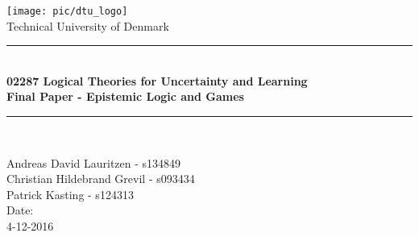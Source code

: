 \begin{titlepage}
\begin{center}
\texttt{[image: pic/dtu\_logo]}\\
\huge Technical University of Denmark
\end{center}
\vspace{-2cm}
\begin{center}
\vspace*{3cm}
\rule{\textwidth}{1mm}\\
\vspace{0.7cm}
\huge\bfseries 02287 Logical Theories for Uncertainty and Learning\\[2mm]
\Large Final Paper - Epistemic Logic and Games \\
\vspace{0.3cm}
\rule{\textwidth}{1mm}\\
\vspace{1.2cm}
\vspace{1.5cm}
\end{center}
\begin{center}
\Large Andreas David Lauritzen - s134849\\
\Large Christian Hildebrand Grevil - 	s093434\\
\Large Patrick Kasting - s124313\\
\vspace{5cm}
Date:\\ 4-12-2016
\end{center}
\end{titlepage}